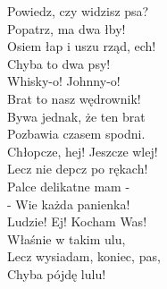 \vspace{1em}
Powiedz, czy widzisz psa? \\
Popatrz, ma dwa łby! \\
Osiem łap i uszu rząd, ech! \\
Chyba to dwa psy! \\

Whisky-o! Johnny-o! \\
Brat to nasz wędrownik! \\
Bywa jednak, że ten brat \\
Pozbawia czasem spodni. \\

Chłopcze, hej! Jeszcze wlej! \\
Lecz nie depcz po rękach! \\
Palce delikatne mam - \\
- Wie każda panienka! \\

Ludzie! Ej! Kocham Was! \\
Właśnie w takim ulu, \\
Lecz wysiadam, koniec, pas, \\
Chyba pójdę lulu!